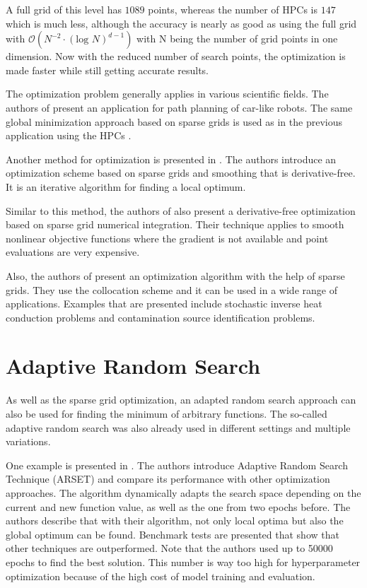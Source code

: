 A full grid of this level has $ 1089 $ points, whereas the number of HPCs is $ 147 $ which is much less, although the accuracy is nearly as good as using the full grid with $ \mathcal{O}\left(N^{-2} \cdot \left(\text{log }N\right)^{d-1}\right) $ with N being the number of grid points in one dimension. Now with the reduced number of search points, the optimization is made faster while still getting accurate results. 
\newline 

The optimization problem generally applies in various scientific fields. The authors of \cite{saska2007path} present an application for path planning of car-like robots. The same global minimization approach based on sparse grids is used as in the previous application using the HPCs \cite{duan2016induction, novak1996global}.
\newline 

Another method for optimization is presented in \cite{hulsmann2013spagrow}. The authors introduce an optimization scheme based on sparse grids and smoothing that is derivative-free. It is an iterative algorithm for finding a local optimum.

Similar to this method, the authors of \cite{chen2013derivative} also present a derivative-free optimization based on sparse grid numerical integration. Their technique applies to smooth nonlinear objective functions where the gradient is not available and point evaluations are very expensive.

Also, the authors of \cite{sankaran2009stochastic} present an optimization algorithm with the help of sparse grids. They use the collocation scheme and it can be used in a wide range of applications. Examples that are presented include stochastic inverse heat conduction problems and contamination source identification problems.

\section{Adaptive Random Search}\label{Adaptive_random_search}

As well as the sparse grid optimization, an adapted random search approach can also be used for finding the minimum of arbitrary functions. The so-called adaptive random search was also already used in different settings and multiple variations. \newline 

One example is presented in \cite{hamzaccebi2006heuristic}. The authors introduce Adaptive Random Search Technique (ARSET) and compare its performance with other optimization approaches. The algorithm dynamically adapts the search space depending on the current and new function value, as well as the one from two epochs before. The authors describe that with their algorithm, not only local optima but also the global optimum can be found. Benchmark tests are presented that show that other techniques are outperformed. Note that the authors used up to 50000 epochs to find the best solution. This number is way too high for hyperparameter optimization because of the high cost of model training and evaluation. \newline 

